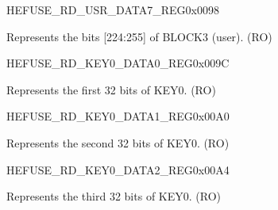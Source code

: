 \begin{register}{H}{EFUSE\_RD\_USR\_DATA7\_REG}{0x{}0098}\label{regdesc:EFUSERDUSRDATA7REG}
%
\regnewline%
\begin{regdesc}\begin{reglist}
\label{fielddesc:EFUSEUSRDATA7}\item [EFUSE\_USR\_DATA7] Represents the bits [224:255] of BLOCK3 (user). (RO)
\end{reglist}\end{regdesc}
\end{register}


\begin{register}{H}{EFUSE\_RD\_KEY0\_DATA0\_REG}{0x{}009C}\label{regdesc:EFUSERDKEY0DATA0REG}
%
\regnewline%
\begin{regdesc}\begin{reglist}
\label{fielddesc:EFUSEKEY0DATA0}\item [EFUSE\_KEY0\_DATA0] Represents the first 32 bits of KEY0. (RO)
\end{reglist}\end{regdesc}
\end{register}


\begin{register}{H}{EFUSE\_RD\_KEY0\_DATA1\_REG}{0x{}00A0}\label{regdesc:EFUSERDKEY0DATA1REG}
%
\regnewline%
\begin{regdesc}\begin{reglist}
\label{fielddesc:EFUSEKEY0DATA1}\item [EFUSE\_KEY0\_DATA1] Represents the second 32 bits of KEY0. (RO)
\end{reglist}\end{regdesc}
\end{register}


\begin{register}{H}{EFUSE\_RD\_KEY0\_DATA2\_REG}{0x{}00A4}\label{regdesc:EFUSERDKEY0DATA2REG}
%
\regnewline%
\begin{regdesc}\begin{reglist}
\label{fielddesc:EFUSEKEY0DATA2}\item [EFUSE\_KEY0\_DATA2] Represents the third 32 bits of KEY0. (RO)
\end{reglist}\end{regdesc}
\end{register}


